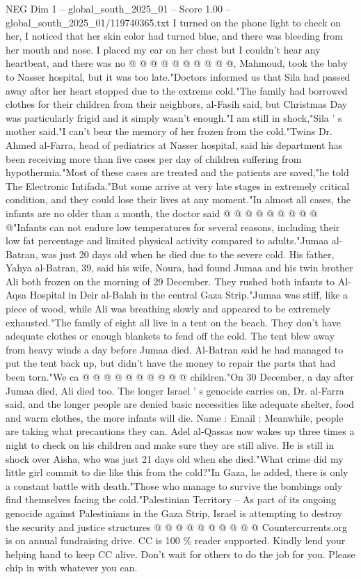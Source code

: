 \begin{textsample}{NEG Dim 1 – global\_south\_2025\_01 – Score 1.00 – global\_south\_2025\_01/119740365.txt}
I turned on the phone light to check on her, I noticed that her skin color had turned blue, and there was bleeding from her mouth and nose.
I placed my ear on her chest but I couldn't hear any heartbeat, and there was no @ @ @ @ @ @ @ @ @ @, Mahmoud, took the baby to Nasser hospital, but it was too late."Doctors informed us that Sila had passed away after her heart stopped due to the extreme cold."The family had borrowed clothes for their children from their neighbors, al-Fasih said, but Christmas Day was particularly frigid and it simply wasn't enough."I am still in shock,"Sila ' s mother said."I can't bear the memory of her frozen from the cold."Twins Dr.
Ahmed al-Farra, head of pediatrics at Nasser hospital, said his department has been receiving more than five cases per day of children suffering from hypothermia."Most of these cases are treated and the patients are saved,"he told The Electronic Intifada."But some arrive at very late stages in extremely critical condition, and they could lose their lives at any moment."In almost all cases, the infants are no older than a month, the doctor said @ @ @ @ @ @ @ @ @ @"Infants can not endure low temperatures for several reasons, including their low fat percentage and limited physical activity compared to adults."Jumaa al-Batran, was just 20 days old when he died due to the severe cold.
His father, Yahya al-Batran, 39, said his wife, Noura, had found Jumaa and his twin brother Ali both frozen on the morning of 29 December.
They rushed both infants to Al-Aqsa Hospital in Deir al-Balah in the central Gaza Strip."Jumaa was stiff, like a piece of wood, while Ali was breathing slowly and appeared to be extremely exhausted."The family of eight all live in a tent on the beach.
They don't have adequate clothes or enough blankets to fend off the cold.
The tent blew away from heavy winds a day before Jumaa died.
Al-Batran said he had managed to put the tent back up, but didn't have the money to repair the parts that had been torn."We ca @ @ @ @ @ @ @ @ @ @ children."On 30 December, a day after Jumaa died, Ali died too.
The longer Israel ' s genocide carries on, Dr. al-Farra said, and the longer people are denied basic necessities like adequate shelter, food and warm clothes, the more infants will die.
Name : Email : Meanwhile, people are taking what precautions they can.
Adel al-Qassas now wakes up three times a night to check on his children and make sure they are still alive.
He is still in shock over Aisha, who was just 21 days old when she died."What crime did my little girl commit to die like this from the cold?"In Gaza, he added, there is only a constant battle with death."Those who manage to survive the bombings only find themselves facing the cold."Palestinian Territory -- As part of its ongoing genocide against Palestinians in the Gaza Strip, Israel is attempting to destroy the security and justice structures @ @ @ @ @ @ @ @ @ @ Countercurrents.org is on annual fundraising drive.
CC is 100 \% reader supported.
Kindly lend your helping hand to keep CC alive.
Don't wait for others to do the job for you.
Please chip in with whatever you can.

\end{textsample}
